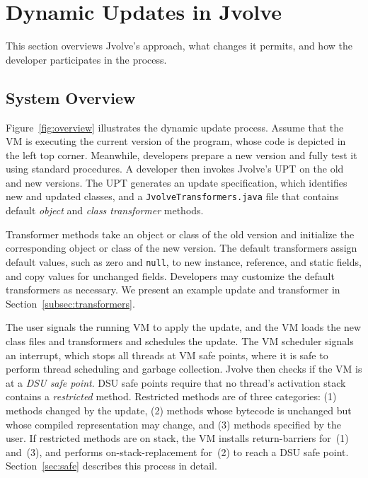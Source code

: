 \documentclass[9pt]{sigplanconf}
\newcommand{\DSU}{{\sc Jvolve}}
\begin{document}


\section{Dynamic Updates in \DSU}

This section overviews \DSU's approach, what changes it permits, and
how the developer participates in the process.

\subsection{System Overview}
\label{sec:overview}

Figure~\ref{fig:overview} illustrates the dynamic update process.
Assume that the VM is executing the current version of the program,
whose code is depicted in the left top corner.  Meanwhile, developers
prepare a new version and fully test it using standard procedures.
A developer 
then invokes \DSU's \ac{UPT} on the old and
new versions. The \ac{UPT} generates an update specification, which identifies
new and updated classes, and a \texttt{JvolveTransformers.java} file
that contains default \emph{object}
and \emph{class transformer} methods.  

Transformer methods take an
object or class of the old version and 
initialize the corresponding object or class of the new version.  The default
transformers assign default values, such as zero and {\tt null}, to new
instance, reference, and static fields, and copy values for unchanged
fields.  Developers may customize the default transformers as
necessary.  We present an example update and transformer in
Section~\ref{subsec:transformers}. %

The user signals the running VM to apply the update, and the VM loads
the new class files and transformers and schedules the update. The VM
scheduler signals an interrupt, which stops all threads at
VM safe points, where it is safe to perform thread scheduling and garbage collection.  \DSU{} then checks if the VM is %
at a \emph{DSU safe point}. DSU safe points require that no thread's
activation stack contains a \emph{restricted} method.  Restricted
methods are of three categories: (1) methods changed by the update,
(2) methods whose bytecode is unchanged but whose compiled
representation may change, and (3) methods specified by the user. If
restricted methods are on stack, the VM installs return-barriers
for~(1) and~(3), and performs on-stack-replacement for~(2) to reach a
DSU safe point.  Section~\ref{sec:safe} describes this process in
detail.
\end{document}
